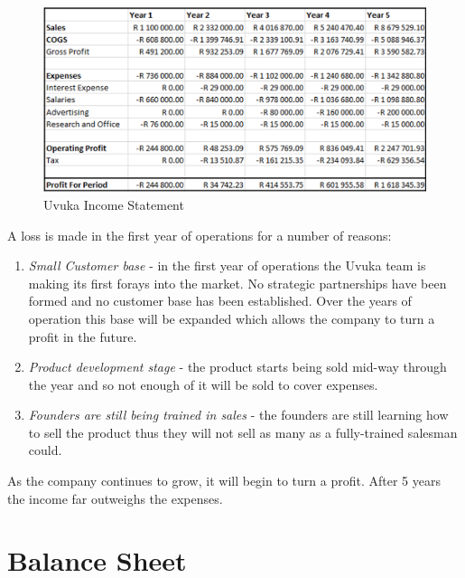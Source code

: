   \begin{figure}[H]
    \centering
    \includegraphics[width=1\textwidth]{images/IncomeStatement}
    \vskip10pt
    \caption[Uvuka Income Statement]{Uvuka Income Statement}
    \label{fig:IncomeStatement}
  \end{figure}

A loss is made in the first year of operations for a number of reasons:
  \begin{enumerate}
        \item \textit{Small Customer base} - in the first year of operations the Uvuka team is making its first forays into the market. No strategic partnerships have been formed and no customer base has been established. Over the years of operation this base will be expanded which allows the company to turn a profit in the future.
        \item \textit{Product development stage} - the product starts being sold mid-way through the year and so not enough of it will be sold to cover expenses.
        \item \textit{Founders are still being trained in sales} - the founders are still learning how to sell the product thus they will not sell as many as a fully-trained salesman could.
        \end{enumerate}
        
As the company continues to grow, it will begin to turn a profit. After 5 years the income far outweighs the expenses.

\pagebreak
\section{Balance Sheet}

